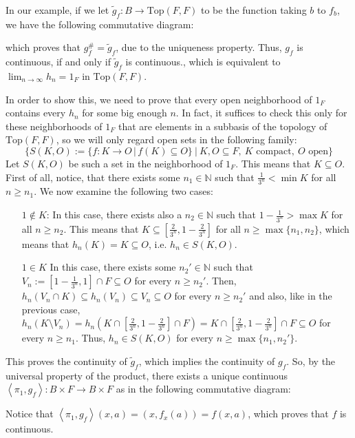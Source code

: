 \begin{example}
In our example, if we let $\tilde{g}_f:B\to\mathrm{Top}(F,F)$ to be the function taking $b$ to $f_b$, we have the following commutative diagram:
\begin{center}
\end{center}
which proves that $g_f^{\#}=\tilde{g}_f$, due to the uniqueness property. Thus, $g_f$ is continuous, if and only if $\tilde{g}_f$ is continuous., which is equivalent to $\lim_{n\to\infty}h_n=1_F$ in $\mathrm{Top}(F,F)$.

In order to show this, we need to prove that every open neighborhood of $1_F$ contains every $h_n$ for some big enough $n$. In fact, it suffices to check this only for these neighborhoods of $1_F$ that are elements in a subbasis of the topology of $\mathrm{Top}(F,F)$, so we will only regard open sets in the following family:
\[\Big\{S(K,O):=\{f:K\to O\,|\,f(K)\subseteq O\}\ \Big|\ K,O\subseteq F,\ K\text{ compact},\ O\text{ open}\Big\}\]
Let $S(K,O)$ be such a set in the neighborhood of $1_F$. This means that $K\subseteq O$. First of all, notice, that there exists some $n_1\in\mathbb{N}$ such that $\frac{1}{3^n}<\min K$ for all $n\geq n_1$. We now examine the following two cases:
\begin{itemize}
\item[$1\not\in K$:] In this case, there exists also a $n_2\in\mathbb{N}$ such that $1-\frac{1}{3^n}>\max K$ for all $n\geq n_2$. This means that $K\subseteq[\frac{2}{3^n},1-\frac{2}{3^n}]$ for all $n\geq\max\{n_1,n_2\}$, which means that $h_n(K)=K\subseteq O$, i.e. $h_n\in S(K,O)$.
\item[$1\in K$] In this case, there exists some $n_2'\in\mathbb{N}$ such that $V_n:=[1-\frac{1}{3^n},1]\cap F\subseteq O$ for every $n\geq n_2'$. Then, $h_n(V_n\cap K)\subseteq h_n(V_n)\subseteq V_n\subseteq O$ for every $n\geq n_2'$ and also, like in the previous case, $h_n(K\setminus V_n)= h_n(K\cap[\frac{2}{3^n},1-\frac{2}{3^n}]\cap F)=K\cap[\frac{2}{3^n},1-\frac{2}{3^n}]\cap F\subseteq O$ for every $n\geq n_1$. Thus, $h_n\in S(K,O)$ for every $n\geq\max\{n_1,n_2'\}$.
\end{itemize}
This proves the continuity of $\tilde{g}_f$, which implies the continuity of $g_f$. So, by the universal property of the product, there exists a unique continuous $\left<\pi_1,g_f\right>:B\times F\to B\times F$ as in the following commutative diagram:
\begin{center}
\end{center}
Notice that $\left<\pi_1,g_f\right>(x,a)=(x,f_x(a))=f(x,a)$, which proves that $f$ is continuous.


\end{example}
